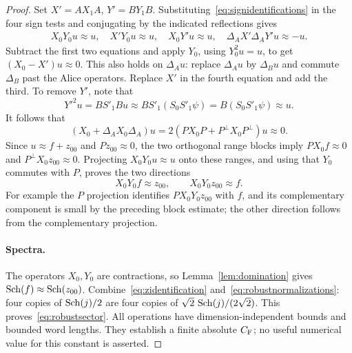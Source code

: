 \begin{proof}
Set $X'=AX_1A$, $Y'=BY_1B$. Substituting~\eqref{eq:signidentifications}
in the four sign tests and conjugating by the indicated reflections gives
\begin{gather}\label{eq:fourfrustration}
X_0Y_0u\approx u,\quad X'Y_0u\approx u,\quad X_0Y'u\approx u,
\quad\Delta_AX'\Delta_AY'u\approx-u.
\end{gather}
Subtract the first two equations and apply $Y_0$, using $Y_0^2u=u$,
to get $(X_0-X')u\approx0$. This also holds on $\Delta_Au$:
replace $\Delta_Au$ by $\Delta_Bu$ and commute $\Delta_B$ past the
Alice operators. Replace $X'$ in the fourth equation and add the third.
To remove $Y'$, note that
\[
Y'^2u=BS'_1Bu\approx BS'_1(S_0S'_1\psi)
=B(S_0S'_1\psi)\approx u.
\]
It follows that
\[
(X_0+\Delta_AX_0\Delta_A)u
=2(PX_0P+P^\perp X_0P^\perp)u\approx0.
\]
Since $u\approx f+z_{00}$ and $Pz_{00}\approx0$, the two orthogonal
range blocks imply $PX_0f\approx0$ and $P^\perp X_0z_{00}\approx0$.
Projecting $X_0Y_0u\approx u$ onto these ranges, and using that $Y_0$
commutes with $P$, proves the two directions
\begin{equation}\label{eq:robustbridge}
X_0Y_0f\approx z_{00},\qquad X_0Y_0z_{00}\approx f.
\end{equation}
For example the $P$ projection identifies $PX_0Y_0z_{00}$ with $f$,
and its complementary component is small by the preceding block estimate;
the other direction follows from the complementary projection.

\paragraph{Spectra.}
The operators $X_0,Y_0$ are contractions, so
Lemma~\ref{lem:domination} gives $\operatorname{Sch}(f)\approx\operatorname{Sch}(z_{00})$.
Combine~\eqref{eq:zidentification} and~\eqref{eq:robustnormalizations}:
four copies of $\operatorname{Sch}(j)/2$ are four copies of
$\sqrt2\,\operatorname{Sch}(j)/(2\sqrt2)$. This proves~\eqref{eq:robustsector}.
All operations have dimension-independent bounds and bounded word lengths.
They establish a finite absolute $C_{\rm F}$; no useful numerical value
for this constant is asserted.
\end{proof}

